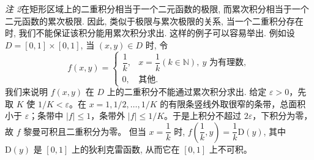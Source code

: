 \documentclass[UTF8,12pt,a4paper,fontset=fandol]{ctexart}
\begin{document}
\noindent\emph{注 2}\quad 在矩形区域上的二重积分相当于一个二元函数的极限, 而累次积分相当于一个二元函数的累次极限. 因此, 类似于极限与累次极限的关系, 当一个二重积分存在时, 我们不能保证该积分能用累次积分求出. 这样的例子可以容易举出. 例如设 $D=[0,1]\times[0,1]$, 当 $(x,y)\in D$ 时, 令
\[
  f(x,y)=
  \begin{cases}
    \dfrac1k, & x=\dfrac1k(k\in\mathbb N),\ y\text{ 为有理数},\\
    0, & \text{其他}.
  \end{cases}
\]
我们来说明 $f(x,y)$ 在 $D$ 上的二重积分不能通过累次积分求出. 给定 $\varepsilon>0$，先取 $K$ 使 $1/K<\varepsilon$。在 $x=1,1/2,\ldots,1/K$ 的有限条竖线外取很窄的条带，总面积小于 $\varepsilon$；条带中 $|f|\le1$，条带外 $|f|\le1/K$。于是上积分不超过 $2\varepsilon$，下积分为零，故 $f$ 黎曼可积且二重积分为零。 但当 $x=\dfrac1k$ 时, $f\left(\dfrac1k,y\right)=\dfrac1k\mathrm D(y)$, 其中 $\mathrm D(y)$ 是 $[0,1]$ 上的狄利克雷函数, 从而它在 $[0,1]$ 上不可积。
\end{document}
